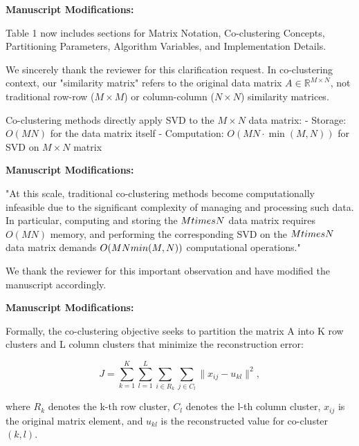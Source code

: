 \documentclass{ar2rc}
\begin{document}
\textbf{Manuscript Modifications:}

Table 1 now includes sections for Matrix Notation, Co-clustering Concepts, Partitioning Parameters, Algorithm Variables, and Implementation Details.


\AR We sincerely thank the reviewer for this clarification request. In co-clustering context, our "similarity matrix" refers to the original data matrix $A \in \mathbb{R}^{M \times N}$, not traditional row-row ($M \times M$) or column-column ($N \times N$) similarity matrices.

Co-clustering methods directly apply SVD to the $M \times N$ data matrix:
- Storage: $O(MN)$ for the data matrix itself
- Computation: $O(MN \cdot \min(M,N))$ for SVD on $M \times N$ matrix

\textbf{Manuscript Modifications:}

"At this scale, traditional co-clustering methods become computationally infeasible due to the significant complexity of managing and processing such data. In particular, computing and storing the $M \\times N$ data matrix requires $O(MN)$ memory, and performing the corresponding SVD on the $M \\times N$ data matrix demands $O(MN\\min(M,N))$ computational operations."


\AR We thank the reviewer for this important observation and have modified the manuscript accordingly.

\textbf{Manuscript Modifications:}

Formally, the co-clustering objective seeks to partition the matrix A into K row clusters and L column clusters that minimize the reconstruction error:

\begin{equation}
  J = \sum_{k=1}^{K} \sum_{l=1}^{L} \sum_{i \in R_k} \sum_{j \in C_l} \| x_{ij} - u_{kl} \|^2,
\end{equation}

where $R_k$ denotes the k-th row cluster, $C_l$ denotes the l-th column cluster, $x_{ij}$ is the original matrix element, and $u_{kl}$ is the reconstructed value for co-cluster $(k,l)$.
\end{document}
